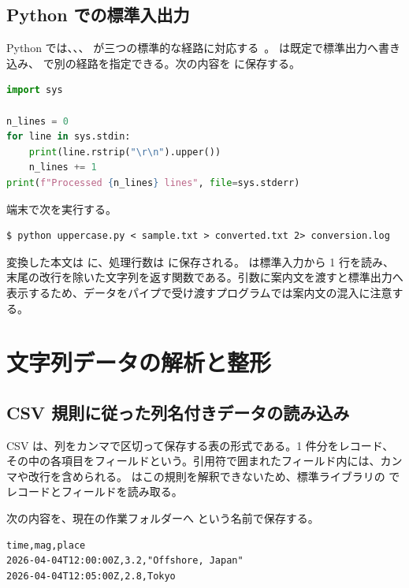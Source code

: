 \subsection{Python での標準入出力}
Python では、、、 が三つの標準的な経路に対応する~\cite{python_sys}。 は既定で標準出力へ書き込み、 で別の経路を指定できる。次の内容を  に保存する。
\begin{lstlisting}[language=Python]
import sys

n_lines = 0
for line in sys.stdin:
    print(line.rstrip("\r\n").upper())
    n_lines += 1
print(f"Processed {n_lines} lines", file=sys.stderr)
\end{lstlisting}
端末で次を実行する。
\begin{lstlisting}[numbers=none, xleftmargin=2\zw]
$ python uppercase.py < sample.txt > converted.txt 2> conversion.log
\end{lstlisting}
変換した本文は  に、処理行数は  に保存される。 は標準入力から 1 行を読み、末尾の改行を除いた文字列を返す関数である。引数に案内文を渡すと標準出力へ表示するため、データをパイプで受け渡すプログラムでは案内文の混入に注意する。

\section{文字列データの解析と整形}

\subsection{CSV 規則に従った列名付きデータの読み込み}\label{sec:csv-reader}

CSV は、列をカンマで区切って保存する表の形式である。1 件分をレコード、その中の各項目をフィールドという。引用符で囲まれたフィールド内には、カンマや改行を含められる。 はこの規則を解釈できないため、標準ライブラリの  でレコードとフィールドを読み取る。

次の内容を、現在の作業フォルダーへ  という名前で保存する。

\begin{lstlisting}[numbers=none, xleftmargin=2\zw, title={events.csv}]
time,mag,place
2026-04-04T12:00:00Z,3.2,"Offshore, Japan"
2026-04-04T12:05:00Z,2.8,Tokyo
\end{lstlisting}

